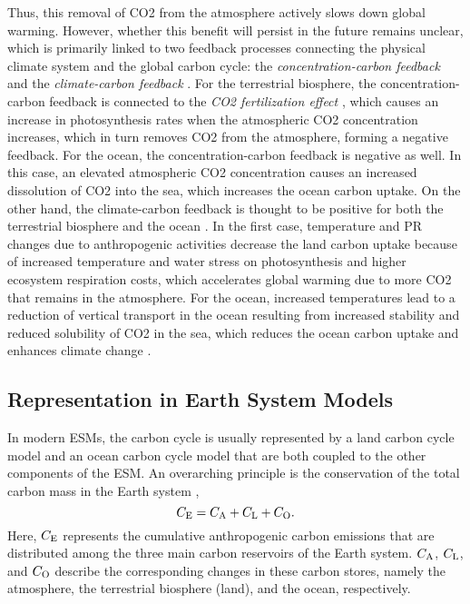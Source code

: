 Thus, this removal of \ac{CO2} from the atmosphere actively slows down global
warming. However, whether this benefit will persist in the future remains
unclear, which is primarily linked to two feedback processes connecting the
physical climate system and the global carbon cycle: the
\emph{concentration-carbon feedback} and the \emph{climate-carbon feedback}
\autocite{Friedlingstein2006, Gregory2009, Collins2013}. For the terrestrial
biosphere, the concentration-carbon feedback is connected to the \emph{\ac{CO2}
  fertilization effect} \autocite{Walker2020}, which causes an increase in
photosynthesis rates when the atmospheric \ac{CO2} concentration increases,
which in turn removes \ac{CO2} from the atmosphere, forming a negative
feedback. For the ocean, the concentration-carbon feedback is negative as well.
In this case, an elevated atmospheric \ac{CO2} concentration causes an
increased dissolution of \ac{CO2} into the sea, which increases the ocean
carbon uptake. On the other hand, the climate-carbon feedback is thought to be
positive for both the terrestrial biosphere and the ocean
\autocite{Gregory2009}. In the first case, temperature and \acl{PR} changes due
to anthropogenic activities decrease the land carbon uptake because of
increased temperature and water stress on photosynthesis and higher ecosystem
respiration costs, which accelerates global warming due to more \ac{CO2} that
remains in the atmosphere. For the ocean, increased temperatures lead to a
reduction of vertical transport in the ocean resulting from increased stability
and reduced solubility of \ac{CO2} in the sea, which reduces the ocean carbon
uptake and enhances climate change \autocite{Gregory2009}.


\subsection{Representation in Earth System Models}
\label{subsec:02:carbon_cycle_representation}

In modern \acp{ESM}, the carbon cycle is usually represented by a land carbon
cycle model and an ocean carbon cycle model that are both coupled to the other
components of the \ac{ESM}. An overarching principle is the conservation of the
total carbon mass in the Earth system \autocite{Gregory2009}, \ie{}
\begin{equation}
  C_{\textnormal{E}}{} = C_{\textnormal{A}}{} + C_{\textnormal{L}}{} + C_{\textnormal{O}}{}.
  \label{eq:02:carbon_balance}
\end{equation}
Here, $C_{\textnormal{E}}{}$ represents the cumulative anthropogenic carbon emissions that are
distributed among the three main carbon reservoirs of the Earth system.
$C_{\textnormal{A}}{}$, $C_{\textnormal{L}}{}$, and $C_{\textnormal{O}}{}$ describe the corresponding changes in these
carbon stores, namely the atmosphere, the terrestrial biosphere (land), and the
ocean, respectively.

